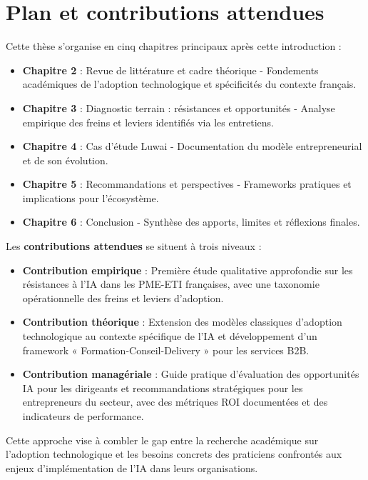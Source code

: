 \section{Plan et contributions attendues}

Cette thèse s'organise en cinq chapitres principaux après cette introduction :
\bigskip
\begin{itemize}
    \item \textbf{Chapitre 2} : Revue de littérature et cadre théorique - Fondements académiques de l'adoption technologique et spécificités du contexte français.
    \item \textbf{Chapitre 3} : Diagnostic terrain : résistances et opportunités - Analyse empirique des freins et leviers identifiés via les entretiens.
    \item \textbf{Chapitre 4} : Cas d'étude Luwai - Documentation du modèle entrepreneurial et de son évolution.
    \item \textbf{Chapitre 5} : Recommandations et perspectives - Frameworks pratiques et implications pour l'écosystème.
    \item \textbf{Chapitre 6} : Conclusion - Synthèse des apports, limites et réflexions finales.
\end{itemize}
\newpage
Les \textbf{contributions attendues} se situent à trois niveaux :
\bigskip
\begin{itemize}
    \item \textbf{Contribution empirique} : Première étude qualitative approfondie sur les résistances à l'IA dans les PME-ETI françaises, avec une taxonomie opérationnelle des freins et leviers d'adoption.
    \item \textbf{Contribution théorique} : Extension des modèles classiques d'adoption technologique au contexte spécifique de l'IA et développement d'un framework « Formation-Conseil-Delivery » pour les services B2B.
    \item \textbf{Contribution managériale} : Guide pratique d'évaluation des opportunités IA pour les dirigeants et recommandations stratégiques pour les entrepreneurs du secteur, avec des métriques ROI documentées et des indicateurs de performance.
\end{itemize}

Cette approche vise à combler le gap entre la recherche académique sur l'adoption technologique et les besoins concrets des praticiens confrontés aux enjeux d'implémentation de l'IA dans leurs organisations.
